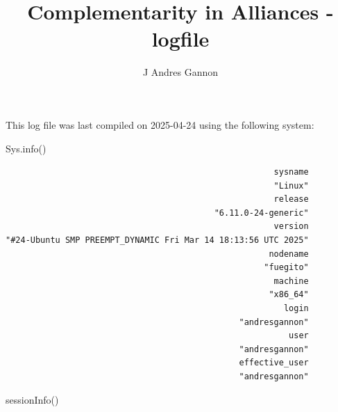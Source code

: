 \documentclass[
  12,
  letterpaper,
  DIV=11,
  numbers=noendperiod]{scrartcl}
\title{\singlespace Complementarity in Alliances - logfile}
\author{J Andres Gannon}
\date{}
\newenvironment{Shaded}{\begin{snugshade}}{\end{snugshade}}
\newcommand{\FunctionTok}[1]{\textcolor[rgb]{0.28,0.35,0.67}{#1}}
\newcommand{\NormalTok}[1]{\textcolor[rgb]{0.00,0.23,0.31}{#1}}
\begin{document}
\maketitle


This log file was last compiled on 2025-04-24 using the following
system:

\begin{Shaded}
\begin{Highlighting}[numbers=left,,]
\FunctionTok{Sys.info}\NormalTok{()}
\end{Highlighting}
\end{Shaded}

\begin{verbatim}
                                                      sysname 
                                                      "Linux" 
                                                      release 
                                          "6.11.0-24-generic" 
                                                      version 
"#24-Ubuntu SMP PREEMPT_DYNAMIC Fri Mar 14 18:13:56 UTC 2025" 
                                                     nodename 
                                                    "fuegito" 
                                                      machine 
                                                     "x86_64" 
                                                        login 
                                               "andresgannon" 
                                                         user 
                                               "andresgannon" 
                                               effective_user 
                                               "andresgannon" 
\end{verbatim}

\begin{Shaded}
\begin{Highlighting}[numbers=left,,]
\FunctionTok{sessionInfo}\NormalTok{()}
\end{Highlighting}
\end{Shaded}
\end{document}
